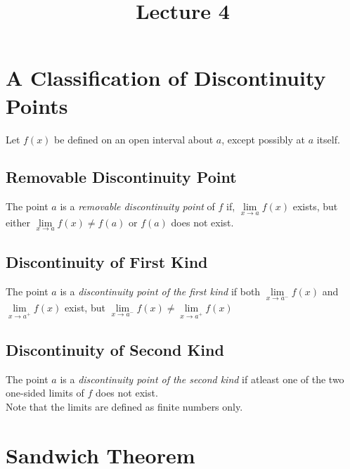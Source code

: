 \documentclass[fleqn]{article}
\title{Lecture 4}
\author{}
\date{\formatdate{6}{11}{2014}}
\begin{document}
	
\maketitle
\setlength{\mathindent}{0pt}

\tableofcontents

\newpage
\section{A Classification of Discontinuity Points}

Let $f(x)$ be defined on an open interval about $a$, except possibly at $a$ itself.

\subsection{Removable Discontinuity Point}

The point $a$ is a \emph{removable discontinuity point} of $f$ if, $\lim\limits_{x \rightarrow a} f(x)$ exists, but either $\lim\limits_{x \rightarrow a} f(x) \neq f(a)$ or $f(a)$ does not exist.


\subsection{Discontinuity of First Kind}

The point $a$ is a \emph{discontinuity point of the first kind} if both $\lim\limits_{x \rightarrow a^-} f(x)$ and $\lim\limits_{x \rightarrow a^+} f(x)$ exist, but $\lim\limits_{x \rightarrow a^-} f(x) \neq \lim\limits_{x \rightarrow a^+} f(x)$

\subsection{Discontinuity of Second Kind}

The point $a$ is a \emph{discontinuity point of the second kind} if atleast one of the two one-sided limits of $f$ does not exist. \\
Note that the limits are defined as finite numbers only.

\section{Sandwich Theorem}
\end{document}
